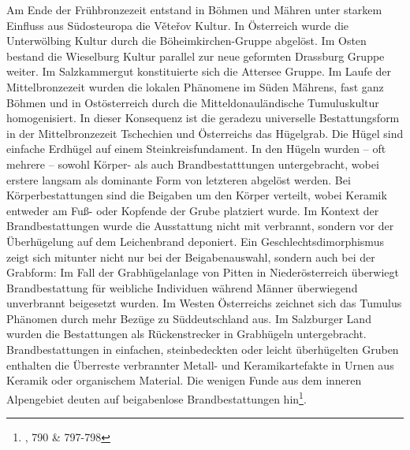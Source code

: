 \documentclass[openany,twoside,twocolumn]{book}
\let\rmarkdownfootnote\footnote%
\def\footnote{\protect\rmarkdownfootnote}
\begin{document}
Am Ende der Frühbronzezeit entstand in Böhmen und Mähren unter starkem
Einfluss aus Südosteuropa die Věteřov Kultur. In Österreich wurde die
Unterwölbing Kultur durch die Böheimkirchen-Gruppe abgelöst. Im Osten
bestand die Wieselburg Kultur parallel zur neue geformten Drassburg
Gruppe weiter. Im Salzkammergut konstituierte sich die Attersee Gruppe.
Im Laufe der Mittelbronzezeit wurden die lokalen Phänomene im Süden
Mährens, fast ganz Böhmen und in Ostösterreich durch die
Mitteldonauländische Tumuluskultur homogenisiert. In dieser Konsequenz
ist die geradezu universelle Bestattungsform in der Mittelbronzezeit
Tschechien und Österreichs das Hügelgrab. Die Hügel sind einfache
Erdhügel auf einem Steinkreisfundament. In den Hügeln wurden -- oft
mehrere -- sowohl Körper- als auch Brandbestatttungen untergebracht,
wobei erstere langsam als dominante Form von letzteren abgelöst werden.
Bei Körperbestattungen sind die Beigaben um den Körper verteilt, wobei
Keramik entweder am Fuß- oder Kopfende der Grube platziert wurde. Im
Kontext der Brandbestattungen wurde die Ausstattung nicht mit verbrannt,
sondern vor der Überhügelung auf dem Leichenbrand deponiert. Ein
Geschlechtsdimorphismus zeigt sich mitunter nicht nur bei der
Beigabenauswahl, sondern auch bei der Grabform: Im Fall der
Grabhügelanlage von Pitten in Niederösterreich überwiegt Brandbestattung
für weibliche Individuen während Männer überwiegend unverbrannt
beigesetzt wurden. Im Westen Österreichs zeichnet sich das Tumulus
Phänomen durch mehr Bezüge zu Süddeutschland aus. Im Salzburger Land
wurden die Bestattungen als Rückenstrecker in Grabhügeln untergebracht.
Brandbestattungen in einfachen, steinbedeckten oder leicht überhügelten
Gruben enthalten die Überreste verbrannter Metall- und Keramikartefakte
in Urnen aus Keramik oder organischem Material. Die wenigen Funde aus
dem inneren Alpengebiet deuten auf beigabenlose Brandbestattungen
hin\footnote{\textcite{lubos_czech_2013}, 790 \& 797-798}.
\end{document}
